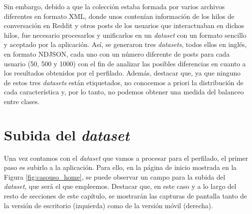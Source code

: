 \bigskip
Sin embargo, debido a que la colección estaba formada por varios archivos diferentes en formato XML, donde unos contenían información de los hilos
de conversación en Reddit y otros posts de los usuarios que interactuaban en dichos hilos, fue necesario procesarlos y unificarlos
en un \textit{dataset} con un formato sencillo y aceptado por la aplicación. Así, se generaron tres \textit{datasets}, todos ellos
en inglés, en formato NDJSON, cada uno con
un número diferente de posts para cada usuario (50, 500 y 1000) con el fin de analizar las posibles diferencias en cuanto a los resultados
obtenidos por el perfilado. Además, destacar que, ya que ninguno de estos tres \textit{datasets} están etiquetados, no conocemos a priori
la distribución de cada característica y, por lo tanto, no podemos obtener una medida del balanceo entre clases.

\section{Subida del \textit{dataset}}
\label{sec:casouso_subida_dataset}

Una vez contamos con el \textit{dataset} que vamos a procesar para el perfilado, el primer paso es subirlo a la aplicación. Para ello,
en la página de inicio mostrada en la Figura \ref{fig:casouso_home}, se puede observar un campo para la subida del \textit{dataset}, que será el que empleemos.
Destacar que, en este caso y a lo largo del resto de secciones de este capítulo,
se mostrarán las capturas de pantalla tanto de la versión de escritorio (izquierda) como de la versión móvil (derecha).

